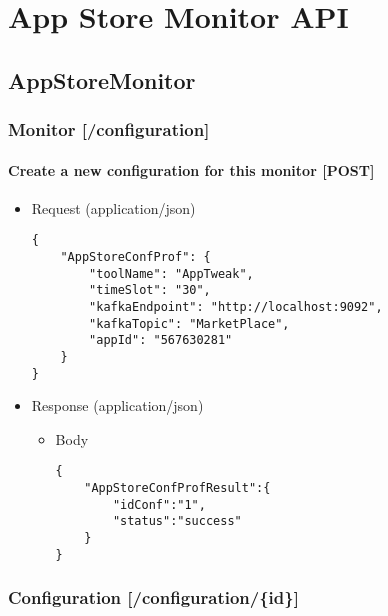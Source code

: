 
\chapter{App Store Monitor API} %

\label{AppStoreMonitor} %

\section{AppStoreMonitor}\label{appstoremonitor}

\subsection{Monitor {[}/configuration{]}}\label{monitor-configuration}

\subsubsection{Create a new configuration for this monitor
{[}POST{]}}\label{create-a-new-configuration-for-this-monitor-post}

\begin{itemize}
\item
  Request (application/json)

\begin{verbatim}
{
    "AppStoreConfProf": {
        "toolName": "AppTweak",
        "timeSlot": "30",
        "kafkaEndpoint": "http://localhost:9092",
        "kafkaTopic": "MarketPlace",
        "appId": "567630281"
    }
}
\end{verbatim}
\item
  Response (application/json)

  \begin{itemize}
  \item
    Body

\begin{verbatim}
{
    "AppStoreConfProfResult":{
        "idConf":"1",
        "status":"success"
    }
}
\end{verbatim}
  \end{itemize}
\end{itemize}

\subsection{Configuration
{[}/configuration/\{id\}{]}}\label{configuration-configurationid}

